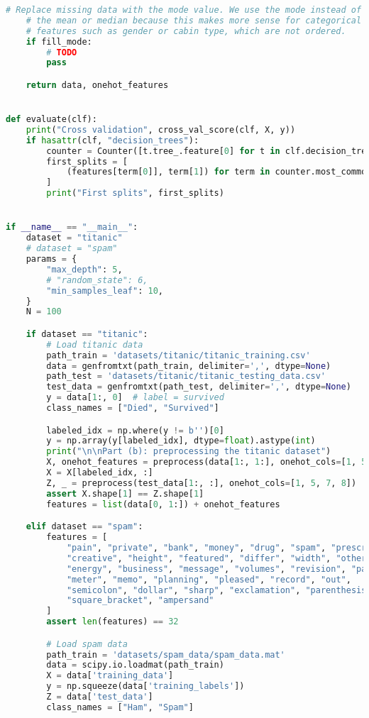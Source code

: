 \documentclass[8pt]{article}
\begin{document}
\begin{lstlisting}[language=Python, caption=随机森林模型接口]
    # Replace missing data with the mode value. We use the mode instead of
    # the mean or median because this makes more sense for categorical
    # features such as gender or cabin type, which are not ordered.
    if fill_mode:
        # TODO
        pass

    return data, onehot_features


def evaluate(clf):
    print("Cross validation", cross_val_score(clf, X, y))
    if hasattr(clf, "decision_trees"):
        counter = Counter([t.tree_.feature[0] for t in clf.decision_trees])
        first_splits = [
            (features[term[0]], term[1]) for term in counter.most_common()
        ]
        print("First splits", first_splits)


if __name__ == "__main__":
    dataset = "titanic"
    # dataset = "spam"
    params = {
        "max_depth": 5,
        # "random_state": 6,
        "min_samples_leaf": 10,
    }
    N = 100

    if dataset == "titanic":
        # Load titanic data
        path_train = 'datasets/titanic/titanic_training.csv'
        data = genfromtxt(path_train, delimiter=',', dtype=None)
        path_test = 'datasets/titanic/titanic_testing_data.csv'
        test_data = genfromtxt(path_test, delimiter=',', dtype=None)
        y = data[1:, 0]  # label = survived
        class_names = ["Died", "Survived"]

        labeled_idx = np.where(y != b'')[0]
        y = np.array(y[labeled_idx], dtype=float).astype(int)
        print("\n\nPart (b): preprocessing the titanic dataset")
        X, onehot_features = preprocess(data[1:, 1:], onehot_cols=[1, 5, 7, 8])
        X = X[labeled_idx, :]
        Z, _ = preprocess(test_data[1:, :], onehot_cols=[1, 5, 7, 8])
        assert X.shape[1] == Z.shape[1]
        features = list(data[0, 1:]) + onehot_features

    elif dataset == "spam":
        features = [
            "pain", "private", "bank", "money", "drug", "spam", "prescription",
            "creative", "height", "featured", "differ", "width", "other",
            "energy", "business", "message", "volumes", "revision", "path",
            "meter", "memo", "planning", "pleased", "record", "out",
            "semicolon", "dollar", "sharp", "exclamation", "parenthesis",
            "square_bracket", "ampersand"
        ]
        assert len(features) == 32

        # Load spam data
        path_train = 'datasets/spam_data/spam_data.mat'
        data = scipy.io.loadmat(path_train)
        X = data['training_data']
        y = np.squeeze(data['training_labels'])
        Z = data['test_data']
        class_names = ["Ham", "Spam"]


\end{lstlisting}
\end{document}
